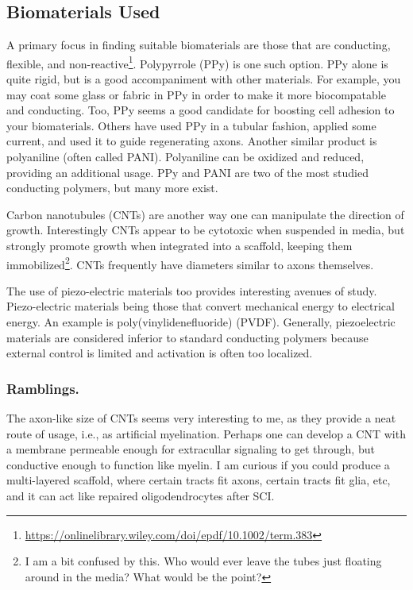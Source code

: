 \subsection{Biomaterials Used}
A primary focus in finding suitable biomaterials are those that are conducting, flexible, and non-reactive\footnote{\url{https://onlinelibrary.wiley.com/doi/epdf/10.1002/term.383}}. Polypyrrole (PPy) is one such option. PPy alone is quite rigid, but is a good accompaniment with other materials. For example, you may coat some glass or fabric in PPy in order to make it more biocompatable and conducting. Too, PPy seems a good candidate for boosting cell adhesion to your biomaterials. Others have used PPy in a tubular fashion, applied some current, and used it to guide regenerating axons. Another similar product is polyaniline (often called PANI). Polyaniline can be oxidized and reduced, providing an additional usage. PPy and PANI are two of the most studied conducting polymers, but many more exist.\newline

Carbon nanotubules (CNTs) are another way one can manipulate the direction of growth. Interestingly CNTs appear to be cytotoxic when suspended in media, but strongly promote growth when integrated into a scaffold, keeping them immobilized\footnote{I am a bit confused by this. Who would ever leave the tubes just floating around in the media? What would be the point?}. CNTs frequently have diameters similar to axons themselves.\newline

The use of piezo-electric materials too provides interesting avenues of study. Piezo-electric materials being those that convert mechanical energy to electrical energy. An example is poly(vinylidenefluoride) (PVDF). Generally, piezoelectric materials are considered inferior to standard conducting polymers because external control is limited and activation is often too localized. 

\subsubsection{Ramblings.}
The axon-like size of CNTs seems very interesting to me, as they provide a neat route of usage, i.e., as artificial myelination. Perhaps one can develop a CNT with a membrane permeable enough for extracullar signaling to get through, but conductive enough to function like myelin. I am curious if you could produce a multi-layered scaffold, where certain tracts fit axons, certain tracts fit glia, etc, and it can act like repaired oligodendrocytes after SCI.\newline

